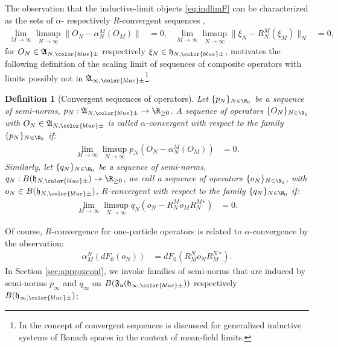 \documentclass[a4paper, 11pt]{article}
\newcommand{\fA}{\mathfrak{A}}\newcommand{\cA}{\mathcal{A}}\newcommand{\dA}{\mathds{A}}\newcommand{\sA}{\mathscr{A}}
\newcommand{\ua}{\textup a}
\newcommand{\fF}{\mathfrak{F}}\newcommand{\cF}{\mathcal{F}}\newcommand{\dF}{\mathds{F}}\newcommand{\sF}{\mathscr{F}}
\newcommand{\fh}{\mathfrak{h}}
\DeclareMathOperator{\1}{\mathds{1}}
\newtheorem{defn}[thm]{Definition}
\begin{document}
The observation that the inductive-limit objects \eqref{eq:indlimF} can be characterized as the sets of $\alpha$- respectively $R$-convergent sequences \cite{DuffieldMeanFieldDynamical},
\begin{align}
\label{eq:convseq}
\lim_{M\rightarrow\infty}\limsup_{N\rightarrow\infty}\|O_{N}-\alpha^{M}_{N}(O_{M})\| & = 0, & \lim_{M\rightarrow\infty}\limsup_{N\rightarrow\infty}\|\xi_{N}-R^{M}_{N}(\xi_{M})\|_{N} & = 0,
\end{align}
for $O_{N}\in\fA_{N,{\color{blue}\pm}}$ respectively $\xi_{N}\in\fh_{N,{\color{blue}\pm}}$, motivates the following definition of the scaling limit of sequences of composite operators with limits possibly not in $\fA_{\infty,{\color{blue}\pm}}$\footnote{In \cite{DuffieldMeanFieldDynamical} the concept of convergent sequences is discussed for generalized inductive systems of Banach spaces in the context of mean-field limits.}.
\begin{defn}[Convergent sequences of operators]
\label{def:convseq}
Let $\{p_{N}\}_{N\in\N_{0}}$ be a sequence of semi-norms, $p_{N}:\fA_{N,{\color{blue}\pm}}\rightarrow\R_{\geq0}$. A sequence of operators $\{O_{N}\}_{N\in\N_{0}}$ with $O_{N}\in\fA_{N,{\color{blue}\pm}}$ is called $\alpha$-convergent with respect to the family $\{p_{N}\}_{N\in\N_{0}}$ if:
\begin{align*}
\lim_{M\rightarrow\infty}\limsup_{N\rightarrow\infty}p_{N}(O_{N}-\alpha^{M}_{N}(O_{M})) & = 0.
\end{align*}
Similarly, let $\{q_{N}\}_{N\in\N_{0}}$ be a sequence of semi-norms, $q_{N}:B(\fh_{N,{\color{blue}\pm}})\rightarrow\R_{\geq0}$, we call a sequence of operators $\{o_{N}\}_{N\in\N_{0}}$, with $o_{N}\in B(\fh_{N,{\color{blue}\pm}})$, $R$-convergent with respect to the family $\{q_{N}\}_{N\in\N_{0}}$ if:
\begin{align*}
\lim_{M\rightarrow\infty}\limsup_{N\rightarrow\infty}q_{N}(o_{N}-R^{M}_{N}o_{M}R^{M}_{N}{}^{*}) & = 0.
\end{align*}
\end{defn}
Of course, $R$-convergence for one-particle operators is related to $\alpha$-convergence by the observation:
\begin{align}
\label{eq:Ralpha}
\alpha^{N}_{M}(dF_{0}(o_{N})) & = dF_{0}(R^{N}_{M}o_{N}R^{N}_{M}{}^{*}).
\end{align}
In Section \ref{sec:approxconf}, we invoke families of semi-norms that are induced by semi-norms $p_{\infty}$ and $q_{\infty}$ on $B(\fF_{\ua}(\fh_{\infty,{\color{blue}\pm}}))$ respectively $B(\fh_{\infty,{\color{blue}\pm}})$:
\end{document}
